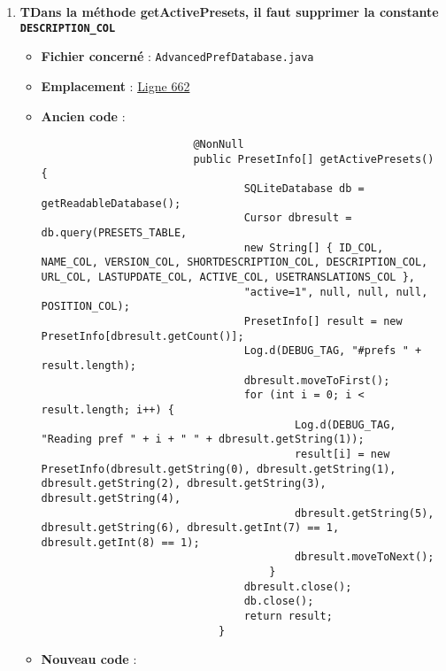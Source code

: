\begin{enumerate}
    \item \textbf{TDans la méthode getActivePresets, il faut supprimer la constante \texttt{DESCRIPTION_COL}}
          \begin{itemize}
              \item \textbf{Fichier concerné} : \texttt{AdvancedPrefDatabase.java}
              \item \textbf{Emplacement} :
                    \href{https://github.com/MarcusWolschon/osmeditor4android/blob/dcabe8084aa15f5551a37c990516bf73398af1bf/src/main/java/de/blau/android/prefs/AdvancedPrefDatabase.java#L662C25-L662C41}{Ligne 662}
              \item \textbf{Ancien code} :
                    \begin{verbatim}
                        @NonNull
                        public PresetInfo[] getActivePresets() {
                                SQLiteDatabase db = getReadableDatabase();
                                Cursor dbresult = db.query(PRESETS_TABLE,
                                new String[] { ID_COL, NAME_COL, VERSION_COL, SHORTDESCRIPTION_COL, DESCRIPTION_COL, URL_COL, LASTUPDATE_COL, ACTIVE_COL, USETRANSLATIONS_COL },
                                "active=1", null, null, null, POSITION_COL);
                                PresetInfo[] result = new PresetInfo[dbresult.getCount()];
                                Log.d(DEBUG_TAG, "#prefs " + result.length);
                                dbresult.moveToFirst();
                                for (int i = 0; i < result.length; i++) {
                                        Log.d(DEBUG_TAG, "Reading pref " + i + " " + dbresult.getString(1));
                                        result[i] = new PresetInfo(dbresult.getString(0), dbresult.getString(1), dbresult.getString(2), dbresult.getString(3), dbresult.getString(4),
                                        dbresult.getString(5), dbresult.getString(6), dbresult.getInt(7) == 1, dbresult.getInt(8) == 1);
                                        dbresult.moveToNext();
                                    }
                                dbresult.close();
                                db.close();
                                return result;
                            }
                    \end{verbatim}
              \item \textbf{Nouveau code} :
                    \begin{verbatim}

\end{verbatim}
\end{itemize}
\end{enumerate}
